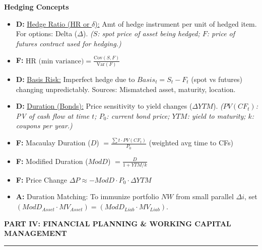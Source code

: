 \documentclass[7pt,landscape]{extarticle} %
\newcommand{\cheatsheetsection}[1]{%
  \vspace{0.25ex plus 0.1ex minus 0.05ex}%
  \noindent\color{SecTitleColor}\textbf{\sffamily\small\MakeUppercase{#1}}%
  \par\vspace{0.02ex}%
  {\color{RuleColor}\hrule height 0.3pt}\par\vspace{0.15ex}%
}
\newcommand{\cheatsheetsubsubsection}[1]{%
  \vspace{0.15ex plus 0.05ex minus 0.05ex}%
  \noindent\textbf{\sffamily\scriptsize #1}%
  \par\vspace{0.05ex}%
}
\newcommand{\D}[1]{\textbf{\textcolor{DefColor}{D:}} \uline{#1}}
\newcommand{\F}[1]{\textbf{\textcolor{FormColor}{F:}} #1}
\newcommand{\A}[1]{\textbf{\textcolor{AppColor}{A:}} #1}
\newcommand{\SF}[1]{\textit{\small (#1)}} %
\begin{document}
\begin{multicols*}{4}
  \cheatsheetsubsubsection{Hedging Concepts}
  \begin{itemize}
    \item \D{Hedge Ratio (HR or $\delta$):} Amt of hedge instrument per unit of hedged item. For options: Delta ($\Delta$).
          \SF{$S$: spot price of asset being hedged; $F$: price of futures contract used for hedging.}
    \item \F{$\text{HR (min variance)} = \frac{\text{Cov}(S,F)}{\text{Var}(F)}$}
    \item \D{Basis Risk:} Imperfect hedge due to $Basis_t = S_t - F_t$ (spot vs futures) changing unpredictably. Sources: Mismatched asset, maturity, location.
    \item \D{Duration (Bonds):} Price sensitivity to yield changes ($\Delta YTM$).
          \SF{$PV(CF_t)$: PV of cash flow at time $t$; $P_0$: current bond price; $YTM$: yield to maturity; $k$: coupons per year.}
    \item \F{Macaulay Duration ($D$) $= \frac{\sum t \cdot PV(CF_t)}{P_0}$} (weighted avg time to CFs)
    \item \F{Modified Duration ($ModD$) $= \frac{D}{1+YTM/k}$}
    \item \F{Price Change $\Delta P \approx -ModD \cdot P_0 \cdot \Delta YTM$}
    \item \A{Duration Matching: To immunize portfolio $NW$ from small parallel $\Delta i$, set $(ModD_{Asset} \cdot MV_{Asset}) = (ModD_{Liab} \cdot MV_{Liab})$.}
  \end{itemize}

  \cheatsheetsection{Part IV: Financial Planning \& Working Capital Management}
  

\end{multicols*}
\end{document}
